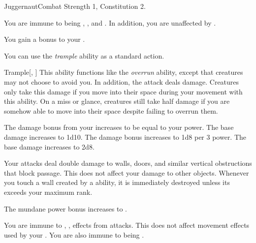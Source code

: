     \begin{feat}{Juggernaut}{Combat}
        \featpre Strength 1, Constitution 2.

         You are immune to being \slowed, \immobilized, and \paralyzed.
        In addition, you are unaffected by .

         You gain a  bonus to your .

         You can use the \textit{trample} ability as a standard action.
        \begin{activeability}{Trample}[, ]
            \rankline
            This ability functions like the \textit{overrun} ability, except that creatures may not choose to avoid you.
            In addition, the attack deals  damage.
            Creatures only take this damage if you move into their space during your movement with this ability.
            On a miss or glance, creatures still take half damage if you are somehow able to move into their space despite failing to overrun them.

            \rankline
             The damage bonus from your  increases to be equal to your power.
             The base damage increases to 1d10.
             The damage bonus increases to 1d8 per 3 power.
             The base damage increases to 2d8.
        \end{activeability}

         Your attacks deal double damage to walls, doors, and similar vertical obstructions that block passage.
        This does not affect your damage to other objects.
        Whenever you touch a wall created by a  ability, it is immediately destroyed unless its  exceeds your maximum rank.

         The mundane power bonus increases to .

         You are immune to , ,  effects from attacks.
        This does not affect movement effects used by your .
        You are also immune to being \grappled.
    \end{feat}

